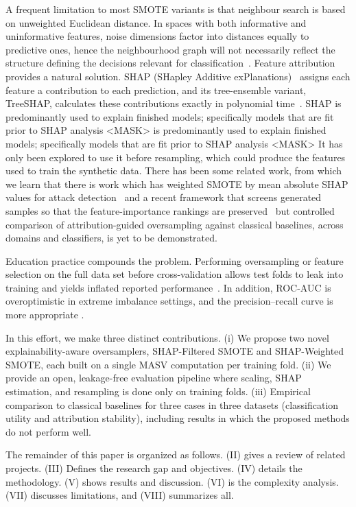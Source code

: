 \documentclass[conference]{IEEEtran}
\begin{document}
A frequent limitation to most SMOTE variants is that neighbour search is based on unweighted Euclidean distance. In spaces with both informative and uninformative features, noise dimensions factor into distances equally to predictive ones, hence the neighbourhood graph will not necessarily reflect the structure defining the decisions relevant for classification~\cite{b3,b4}. Feature attribution provides a natural solution. SHAP (SHapley Additive exPlanations)~\cite{b5} assigns each feature a contribution to each prediction, and its tree-ensemble variant, TreeSHAP, calculates these contributions exactly in polynomial time~\cite{b6}. SHAP is predominantly used to explain finished models; specifically models that are fit prior to SHAP analysis   <MASK> is predominantly used to explain finished models; specifically models that are fit prior to SHAP analysis   <MASK>      It has only been explored to use it before resampling, which could produce the features used to train the synthetic data. There has been some related work, from which we learn that there is work which has weighted SMOTE by mean absolute SHAP values for attack detection~\cite{b7} and a recent framework that screens generated samples so that the feature-importance rankings are preserved~\cite{b8} but controlled comparison of attribution-guided oversampling against classical baselines, across domains and classifiers, is yet to be demonstrated.

Education practice compounds the problem. Performing oversampling or feature selection on the full data set before cross-validation allows test folds to leak into training and yields inflated reported performance~\cite{b9}. In addition, ROC-AUC is overoptimistic in extreme imbalance settings, and the precision--recall curve is more appropriate \cite{b10}.

In this effort, we make three distinct contributions. (i) We propose two novel explainability-aware oversamplers, SHAP-Filtered SMOTE and SHAP-Weighted SMOTE, each built on a single MASV computation per training fold. (ii) We provide an open, leakage-free evaluation pipeline where scaling, SHAP estimation, and resampling is done only on training folds. (iii) Empirical comparison to classical baselines for three cases in three datasets (classification utility and attribution stability), including results in which the proposed methods do not perform well.

The remainder of this paper is organized as follows. (II) gives a review of related projects. (III) Defines the research gap and objectives. (IV) details the methodology. (V) shows results and discussion. (VI) is the complexity analysis. (VII) discusses limitations, and (VIII) summarizes all.
\end{document}
